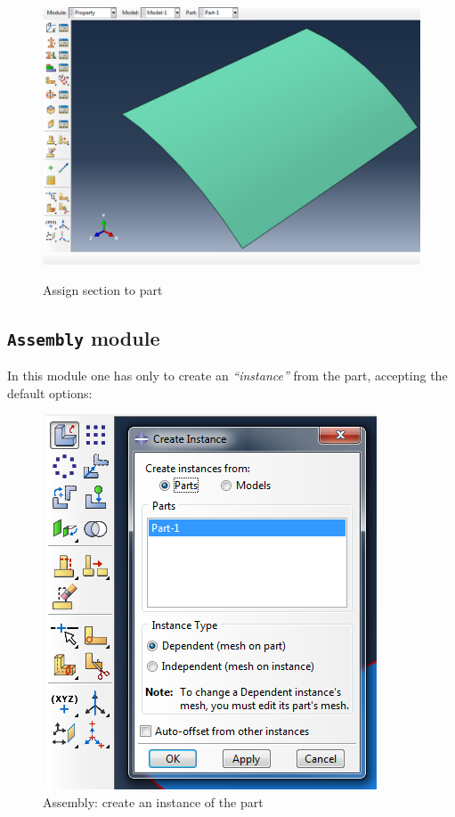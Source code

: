 \documentclass[english,a4paper,12pt]{article}
\begin{document}
\begin{figure}[h!tp]
{\includegraphics[scale=0.3]{capturas/05a_section-assigned}}
\caption{Assign section to part}
\label{fig:section-assign}
\end{figure}
\clearpage

\subsection{\texttt{Assembly} module}

In this module one has only to create an \emph{``instance''} from the part, accepting the default options:
\begin{figure}[h!tp]
\centering
\includegraphics[scale=0.4]{capturas/14-assembly.png}
\caption{Assembly: create an instance of the part}
\label{fig:assembly}
\end{figure}
\end{document}
